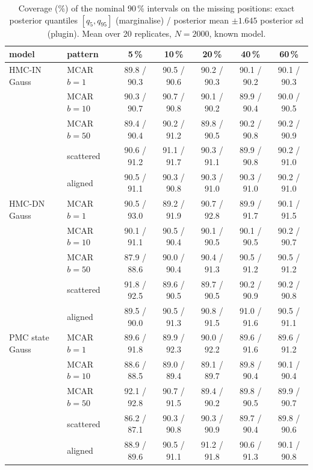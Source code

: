 \begin{table}[htbp]
  \centering
  \small
  \setlength{\tabcolsep}{4pt}
  \caption{Coverage (\%) of the nominal 90\,\% intervals on the missing positions: exact posterior quantiles $[q_{5}, q_{95}]$ (marginalise) / posterior mean $\pm 1.645$ posterior sd (plugin). Mean over 20 replicates, $N = 2000$, known model.}
  \label{tab:missing-cov90}
  \begin{tabular}{llccccc}
    \toprule
    model & pattern & 5\,\% & 10\,\% & 20\,\% & 40\,\% & 60\,\% \\
    \midrule
    HMC-IN Gauss & MCAR $b{=}1$ & 89.8 / 90.3 & 90.5 / 90.6 & 90.2 / 90.3 & 90.1 / 90.2 & 90.1 / 90.3 \\
     & MCAR $b{=}10$ & 90.3 / 90.7 & 90.7 / 90.8 & 90.1 / 90.2 & 89.9 / 90.4 & 90.0 / 90.5 \\
     & MCAR $b{=}50$ & 89.4 / 90.4 & 90.2 / 91.2 & 89.8 / 90.5 & 90.2 / 90.8 & 90.2 / 90.9 \\
     & scattered & 90.6 / 91.2 & 91.1 / 91.7 & 90.3 / 91.1 & 89.9 / 90.8 & 90.2 / 91.0 \\
     & aligned & 90.5 / 91.1 & 90.3 / 90.8 & 90.3 / 91.0 & 90.3 / 91.0 & 90.2 / 91.0 \\
    \addlinespace
    HMC-DN Gauss & MCAR $b{=}1$ & 90.5 / 93.0 & 89.2 / 91.9 & 90.7 / 92.8 & 89.9 / 91.7 & 90.1 / 91.5 \\
     & MCAR $b{=}10$ & 90.1 / 91.1 & 90.5 / 90.4 & 90.1 / 90.5 & 90.1 / 90.5 & 90.2 / 90.7 \\
     & MCAR $b{=}50$ & 87.9 / 88.6 & 90.0 / 90.4 & 90.4 / 91.3 & 90.5 / 91.2 & 90.5 / 91.2 \\
     & scattered & 91.8 / 92.5 & 89.6 / 90.5 & 89.7 / 90.5 & 90.2 / 90.9 & 90.2 / 90.8 \\
     & aligned & 89.5 / 90.0 & 90.5 / 91.3 & 90.8 / 91.5 & 91.0 / 91.6 & 90.5 / 91.1 \\
    \addlinespace
    PMC state Gauss & MCAR $b{=}1$ & 89.6 / 91.8 & 89.9 / 92.3 & 90.0 / 92.2 & 89.6 / 91.6 & 89.6 / 91.2 \\
     & MCAR $b{=}10$ & 88.6 / 88.5 & 89.0 / 89.4 & 89.1 / 89.7 & 89.8 / 90.4 & 90.1 / 90.4 \\
     & MCAR $b{=}50$ & 92.1 / 92.8 & 90.7 / 91.5 & 89.4 / 90.2 & 89.8 / 90.5 & 89.9 / 90.7 \\
     & scattered & 86.2 / 87.1 & 90.3 / 90.8 & 90.3 / 90.9 & 89.7 / 90.4 & 89.8 / 90.6 \\
     & aligned & 88.9 / 89.6 & 90.5 / 91.1 & 91.2 / 91.8 & 90.6 / 91.3 & 90.1 / 90.8 \\

\end{tabular}
\end{table}
